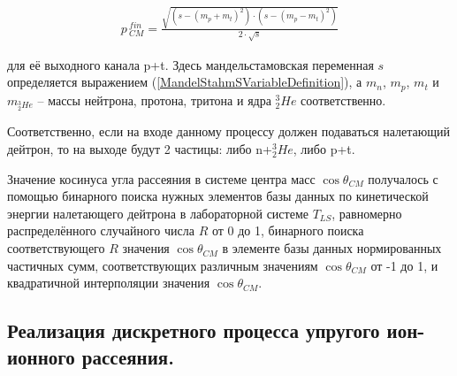 \documentclass[a4paper,12pt]{article}
\begin{document}
\begin{large}
\begin{equation}
\label{PCMInelasticDDAfterPT}
\begin{aligned} 
  p\,_{CM}^{fin} = \frac{ \sqrt{ \left( s-\left( m_p + m_t\right)^2 \right) \cdot \left( s-\left( m_p - m_t \right)^2 \right) } }{2\cdot \sqrt{s}}
\end{aligned}
\end{equation}

	для её выходного канала p+t.
	Здесь мандельстамовская переменная $s$ определяется выражением (\ref{MandelStahmSVariableDefinition}), а $m_n$, $m_p$, $m_t$ и $m_{^3_2He}$ -- массы нейтрона, протона, тритона и ядра $^3_2He$ соответственно.
	
	Соответственно, если на входе данному процессу должен подаваться налетающий дейтрон, то на выходе будут 2 частицы: либо n+$^3_2He$, либо p+t.
	
	Значение косинуса угла рассеяния в системе центра масс $\cos{\theta_{CM}}$ получалось с помощью бинарного поиска нужных элементов базы данных по кинетической энергии налетающего дейтрона в лабораторной системе $T_{LS}$, равномерно распределённого случайного числа $R$ от 0 до 1, бинарного поиска соответствующего $R$ значения $\cos{\theta_{CM}}$ в элементе базы данных нормированных частичных сумм, соответствующих различным значениям $\cos{\theta_{CM}}$ от -1 до 1, и квадратичной интерполяции значения $\cos{\theta_{CM}}$. 
	

\subsection{Реализация дискретного процесса упругого ион-ионного рассеяния.}
\label{ElasticIonIonScatteringRealization}


\end{large}
\end{document}
